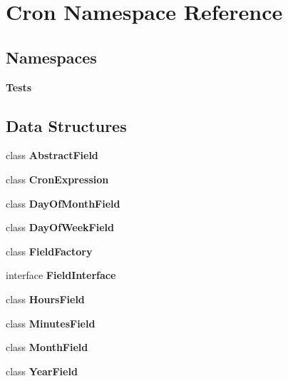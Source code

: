 \section{Cron Namespace Reference}
\label{namespace_cron}
\subsection*{Namespaces}
\begin{DoxyCompactItemize}
\item 
 {\bf Tests}
\end{DoxyCompactItemize}
\subsection*{Data Structures}
\begin{DoxyCompactItemize}
\item 
class {\bf Abstract\+Field}
\item 
class {\bf Cron\+Expression}
\item 
class {\bf Day\+Of\+Month\+Field}
\item 
class {\bf Day\+Of\+Week\+Field}
\item 
class {\bf Field\+Factory}
\item 
interface {\bf Field\+Interface}
\item 
class {\bf Hours\+Field}
\item 
class {\bf Minutes\+Field}
\item 
class {\bf Month\+Field}
\item 
class {\bf Year\+Field}
\end{DoxyCompactItemize}
